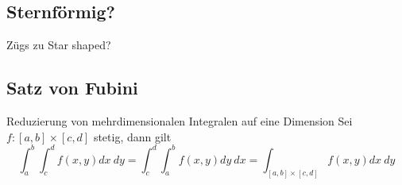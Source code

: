 \subsection{Sternförmig?}
Zügs zu Star shaped?

\subsection{Satz von Fubini}
Reduzierung von mehrdimensionalen Integralen auf eine Dimension
Sei $f: [a,b] \times [c, d]$ stetig, dann gilt
\[ \int_a^b \int_c^d f(x, y) dx ~ dy = \int_c^d \int_a^b f(x, y) dy ~ dx = \int_{[a,b] \times [c, d]} f(x, y) dx ~ dy   \]